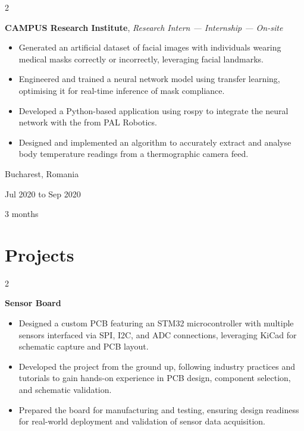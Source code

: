 \documentclass[10pt, a4paper]{article}
\newenvironment{highlights}{
    \begin{itemize}[
        topsep=0.1 cm,
        parsep=0.1 cm,
        partopsep=0pt,
        itemsep=0pt,
        leftmargin=0 cm + 10pt
    ]
}{
    \end{itemize}
} %
\newenvironment{twocolentry}[2][]{
    \onecolentry
    \def\secondColumn{#2}
    \setcolumnwidth{\fill, 3.5 cm}
    \begin{paracol}{2}
}{
    \switchcolumn \raggedleft \secondColumn
    \end{paracol}
    \endonecolentry
} %
\let\hrefWithoutArrow\href
\renewcommand{\href}[2]{\hrefWithoutArrow{#1}{\ifthenelse{\equal{#2}{}}{ }{#2 }\raisebox{.15ex}{\footnotesize \faExternalLink*}}}
\begin{document}
        \begin{twocolentry}{
            Bucharest, Romania

        Jul 2020 to Sep 2020

        3 months
        }
            \textbf{CAMPUS Research Institute}, \textit{Research Intern — Internship — On-site}
            \begin{highlights}
                \item Generated an artificial dataset of facial images with individuals wearing medical masks correctly or incorrectly, leveraging facial landmarks.
                \item Engineered and trained a neural network model using transfer learning, optimising it for real-time inference of mask compliance.
                \item Developed a Python-based application using rospy to integrate the neural network with the \href{https://pal-robotics.com/robot/tiago}{TIAGo} from PAL Robotics.
                \item Designed and implemented an algorithm to accurately extract and analyse body temperature readings from a thermographic camera feed.
            \end{highlights}
        \end{twocolentry}



    
    \section{Projects}



        
        \begin{twocolentry}{
            \href{https://github.com/cristiancristea00/sensor-board}{GitHub}
        }
            \textbf{Sensor Board}
            \begin{highlights}
                \item Designed a custom PCB featuring an STM32 microcontroller with multiple sensors interfaced via SPI, I2C, and ADC connections, leveraging KiCad for schematic capture and PCB layout.
                \item Developed the project from the ground up, following industry practices and tutorials to gain hands-on experience in PCB design, component selection, and schematic validation.
                \item Prepared the board for manufacturing and testing, ensuring design readiness for real-world deployment and validation of sensor data acquisition.
            \end{highlights}
        \end{twocolentry}
\end{document}
